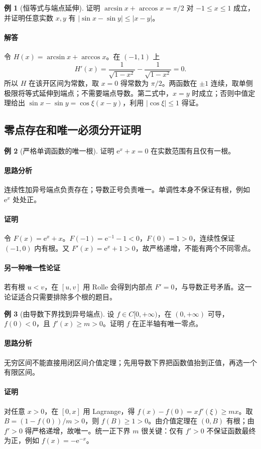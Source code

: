 \documentclass[UTF8,fontset=fandol,12pt,oneside,openany]{ctexrep}
\newcommand{\ee}{\mathrm e}
\theoremstyle{definition}
\newtheorem{example}{例}[chapter]
\begin{document}
\begin{example}[恒等式与端点延伸]
证明 $\arcsin x+\arccos x=\pi/2$ 对 $-1\le x\le1$ 成立，并证明任意实数 $x,y$ 有 $|\sin x-\sin y|\le|x-y|$。
\end{example}
\paragraph{解答}
令 $H(x)=\arcsin x+\arccos x$。在 $(-1,1)$ 上
\[
H'(x)=\frac1{\sqrt{1-x^2}}-\frac1{\sqrt{1-x^2}}=0.
\]
所以 $H$ 在该开区间为常数，取 $x=0$ 得常数为 $\pi/2$。两函数在 $\pm1$ 连续，取单侧极限将等式延伸到端点；不需要端点导数。第二式中，$x=y$ 时成立；否则中值定理给出 $\sin x-\sin y=\cos\xi(x-y)$，利用 $|\cos\xi|\le1$ 得证。

\subsection{零点存在和唯一必须分开证明}
\begin{example}[严格单调函数的唯一根]
证明 $\ee^x+x=0$ 在实数范围有且仅有一根。
\end{example}
\paragraph{思路分析}
连续性加异号端点负责存在；导数正号负责唯一。单调性本身不保证有根，例如 $\ee^x$ 处处正。
\paragraph{证明}
令 $F(x)=\ee^x+x$。$F(-1)=\ee^{-1}-1<0$，$F(0)=1>0$，连续性保证 $(-1,0)$ 内有根。又 $F'(x)=\ee^x+1>0$，故严格递增，不能有两个不同零点。
\paragraph{另一种唯一性论证}
若有根 $u<v$，在 $[u,v]$ 用 Rolle 会得到内部点 $F'=0$，与导数正号矛盾。这一论证适合只需要排除多个根的题目。

\begin{example}[由导数下界找到异号端点]
设 $f\in C[0,+\infty)$，在 $(0,+\infty)$ 可导，$f(0)<0$，且 $f'(x)\ge m>0$。证明 $f$ 在正半轴有唯一零点。
\end{example}
\paragraph{思路分析}
无穷区间不能直接用闭区间介值定理；先用导数下界把函数值抬到正值，再选一个有限区间。
\paragraph{证明}
对任意 $x>0$，在 $[0,x]$ 用 Lagrange，得 $f(x)-f(0)=xf'(\xi)\ge mx$。取 $B=(1-f(0))/m>0$，则 $f(B)\ge1>0$。由介值定理在 $(0,B)$ 有根；由 $f'>0$ 得严格递增，故唯一。统一正下界 $m$ 很关键：仅有 $f'>0$ 不保证函数最终为正，例如 $f(x)=-\ee^{-x}$。
\end{document}
